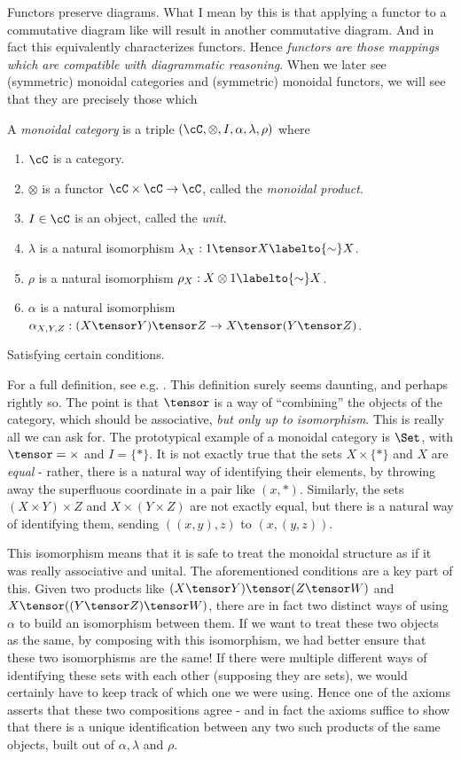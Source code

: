 \documentclass{article}
\begin{document}
Functors preserve diagrams. What I mean by this is that applying a functor to a commutative diagram like  will result in another commutative diagram.
And in fact this equivalently characterizes functors.
Hence \emph{functors are those mappings which are compatible with diagrammatic reasoning}.
When we later see (symmetric) monoidal categories and (symmetric) monoidal functors, we will see that they are precisely those which 

\begin{definition}
A \emph{monoidal category} is a triple $(\cC, \otimes, I, \alpha, \lambda, \rho)$ where
    \begin{enumerate}
        \item $\cC$ is a category.
        \item $\otimes$ is a functor $\cC \times \cC \to \cC$, called the \emph{monoidal product}.
        \item $I \in \cC$ is an object, called the \emph{unit}.
        \item $\lambda$ is a natural isomorphism $\lambda_X: 1 \tensor X \labelto{\sim} X$.
        \item $\rho$ is a natural isomorphism $\rho_X: X \otimes 1 \labelto{\sim} X$.
        \item $\alpha$ is a natural isomorphism $\alpha_{X,Y,Z}: (X \tensor Y) \tensor Z \to X \tensor (Y \tensor Z)$.
    \end{enumerate}
    Satisfying certain conditions.
\end{definition}
For a full definition, see e.g. .
This definition surely seems daunting, and perhaps rightly so.
The point is that $\tensor$ is a way of ``combining'' the objects of the category, which should be associative, \emph{but only up to isomorphism}.
This is really all we can ask for. The prototypical example of a monoidal category is $\Set$, with $\tensor = \times$ and $I = \{*\}$.
It is not exactly true that the sets $X \times \{*\}$ and $X$ are \emph{equal} - rather, there is a natural way of identifying their elements, by throwing away the superfluous coordinate in a pair like $(x,*)$.
Similarly, the sets $(X \times Y) \times Z$ and $X \times (Y \times Z)$ are not exactly equal, but there is a natural way of identifying them, sending $((x,y),z)$ to $(x,(y,z))$.

This isomorphism means that it is safe to treat the monoidal structure as if it was really associative and unital.
The aforementioned conditions are a key part of this.
Given two products like $(X \tensor Y) \tensor (Z \tensor W)$ and $X \tensor ((Y \tensor Z) \tensor W)$, there are in fact two distinct ways of using $\alpha$ to build an isomorphism between them. If we want to treat these two objects as the same, by composing with this isomorphism, we had better ensure that these two isomorphisms are the same! If there were multiple different ways of identifying these sets with each other (supposing they are sets), we would certainly have to keep track of which one we were using.\footnotemark
Hence one of the axioms asserts that these two compositions agree - and in fact the axioms suffice to show that there is a unique identification between any two such products of the same objects, built out of $\alpha, \lambda$ and $\rho$.
\end{document}
